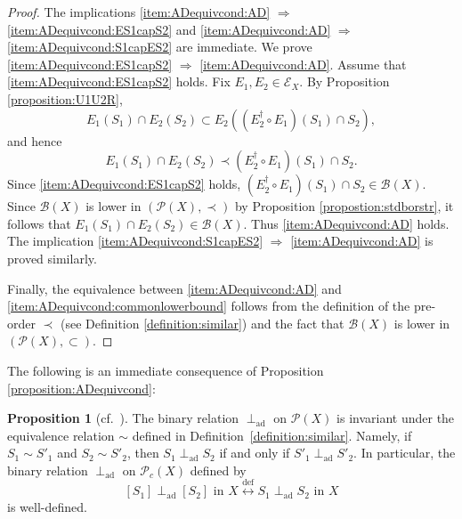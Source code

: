 \documentclass[12pt, a4paper]{amsart}
\theoremstyle{definition}
\newtheorem{proposition}[theorem]{Proposition}
\newcommand{\defarrow}{\mathrel{\stackrel{\mathrm{def}}{\longleftrightarrow}}}
\newcommand{\adperp}{\mathrel{\perp_{\mathrm{ad}}}}
\begin{document}
\begin{proof}
The implications \eqref{item:ADequivcond:AD} $\Rightarrow$ \eqref{item:ADequivcond:ES1capS2} and \eqref{item:ADequivcond:AD} $\Rightarrow$ \eqref{item:ADequivcond:S1capES2} are immediate. We prove \eqref{item:ADequivcond:ES1capS2} $\Rightarrow$ \eqref{item:ADequivcond:AD}. Assume that \eqref{item:ADequivcond:ES1capS2} holds. Fix $E_1,E_2 \in \mathcal{E}_X$. By Proposition \ref{proposition:U1U2R},
\[
E_1(S_1) \cap E_2(S_2) \subset E_2((E_2^\dagger \circ E_1)(S_1) \cap S_2),
\]
and hence
\[
E_1(S_1) \cap E_2(S_2) \prec (E_2^\dagger \circ E_1)(S_1) \cap S_2.
\]
Since \eqref{item:ADequivcond:ES1capS2} holds, $(E_2^\dagger \circ E_1)(S_1) \cap S_2 \in \mathcal{B}(X)$. Since $\mathcal{B}(X)$ is lower in $(\mathcal{P}(X),\prec)$ by Proposition \ref{propostion:stdborstr}, it follows that $E_1(S_1) \cap E_2(S_2) \in \mathcal{B}(X)$. Thus \eqref{item:ADequivcond:AD} holds. The implication \eqref{item:ADequivcond:S1capES2} $\Rightarrow$ \eqref{item:ADequivcond:AD} is proved similarly.

Finally, the equivalence between \eqref{item:ADequivcond:AD} and \eqref{item:ADequivcond:commonlowerbound} follows from the definition of the pre-order $\prec$ (see Definition \ref{definition:similar}) and the fact that $\mathcal{B}(X)$ is lower in $(\mathcal{P}(X),\subset)$.
\end{proof}

The following is an immediate consequence of Proposition \ref{proposition:ADequivcond}:

\begin{proposition}[cf.~{\cite[Lemma~4.10]{KalantariHonari2016}}]
The binary relation $\adperp$ on $\mathcal{P}(X)$ is invariant under the equivalence relation $\sim$ defined in Definition~\ref{definition:similar}. Namely, if $S_1 \sim S'_1$ and $S_2 \sim S'_2$, then $S_1 \adperp S_2$ if and only if $S'_1 \adperp S'_2$. In particular, the binary relation $\adperp$ on $\mathcal{P}_c(X)$ defined by 
\[
[S_1] \adperp [S_2] \text{ in } X \defarrow S_1 \adperp S_2 \text{ in } X
\]
is well-defined.
\end{proposition}
\end{document}
